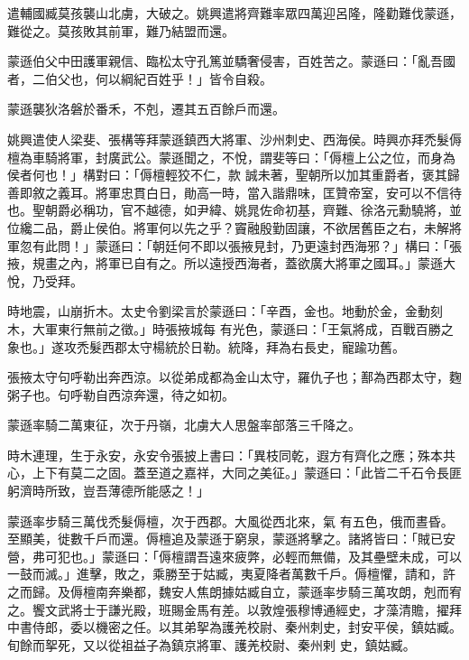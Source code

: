 \begin{pinyinscope}
 遣輔國臧莫孩襲山北虜，大破之。姚興遣將齊難率眾四萬迎呂隆，隆勸難伐蒙遜，難從之。莫孩敗其前軍，難乃結盟而還。



 蒙遜伯父中田護軍親信、臨松太守孔篤並驕奢侵害，百姓苦之。蒙遜曰：「亂吾國者，二伯父也，何以綱紀百姓乎！」皆令自殺。



 蒙遜襲狄洛磐於番禾，不剋，遷其五百餘戶而還。



 姚興遣使人梁斐、張構等拜蒙遜鎮西大將軍、沙州刺史、西海侯。時興亦拜禿髮傉檀為車騎將軍，封廣武公。蒙遜聞之，不悅，謂斐等曰：「傉檀上公之位，而身為侯者何也！」構對曰：「傉檀輕狡不仁，款
 誠未著，聖朝所以加其重爵者，褒其歸善即敘之義耳。將軍忠貫白日，勛高一時，當入諧鼎味，匡贊帝室，安可以不信待也。聖朝爵必稱功，官不越德，如尹緯、姚晁佐命初基，齊難、徐洛元勳驍將，並位纔二品，爵止侯伯。將軍何以先之乎？竇融殷勤固讓，不欲居舊臣之右，未解將軍忽有此問！」蒙遜曰：「朝廷何不即以張掖見封，乃更遠封西海邪？」構曰：「張掖，規畫之內，將軍已自有之。所以遠授西海者，蓋欲廣大將軍之國耳。」蒙遜大悅，乃受拜。



 時地震，山崩折木。太史令劉梁言於蒙遜曰：「辛酉，金也。地動於金，金動刻木，大軍東行無前之徵。」時張掖城每
 有光色，蒙遜曰：「王氣將成，百戰百勝之象也。」遂攻禿髮西郡太守楊統於日勒。統降，拜為右長史，寵踰功舊。



 張掖太守句呼勒出奔西涼。以從弟成都為金山太守，羅仇子也；鄯為西郡太守，麴粥子也。句呼勒自西涼奔還，待之如初。



 蒙遜率騎二萬東征，次于丹嶺，北虜大人思盤率部落三千降之。



 時木連理，生于永安，永安令張披上書曰：「異枝同乾，遐方有齊化之應；殊本共心，上下有莫二之固。蓋至道之嘉祥，大同之美征。」蒙遜曰：「此皆二千石令長匪躬濟時所致，豈吾薄德所能感之！」



 蒙遜率步騎三萬伐禿髮傉檀，次于西郡。大風從西北來，氣
 有五色，俄而晝昏。至顯美，徙數千戶而還。傉檀追及蒙遜于窮泉，蒙遜將擊之。諸將皆曰：「賊已安營，弗可犯也。」蒙遜曰：「傉檀謂吾遠來疲弊，必輕而無備，及其壘壁未成，可以一鼓而滅。」進擊，敗之，乘勝至于姑臧，夷夏降者萬數千戶。傉檀懼，請和，許之而歸。及傉檀南奔樂都，魏安人焦朗據姑臧自立，蒙遜率步騎三萬攻朗，剋而宥之。饗文武將士于謙光殿，班賜金馬有差。以敦煌張穆博通經史，才藻清贍，擢拜中書侍郎，委以機密之任。以其弟挐為護羌校尉、秦州刺史，封安平侯，鎮姑臧。旬餘而挐死，又以從祖益子為鎮京將軍、護羌校尉、秦州剌
 史，鎮姑臧。




\end{pinyinscope}
